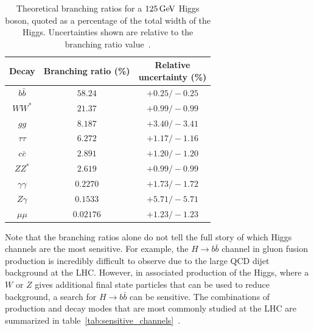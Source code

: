 \begin{table}[h!]
\centering
\captionsetup{justification=centering}

\hspace{-10pt}
\begin{tabular}{|c|c|c|}
\hline
Decay & Branching ratio (\%) & \specialcell{Relative\\uncertainty (\%)} \\ \hline
$b\bar{b}$ & $58.24$ & $+0.25/-0.25$\\ \hline
$WW^*$ & $21.37$ & $+0.99/-0.99$ \\ \hline
$gg$ & $8.187$ & $+3.40/-3.41$ \\ \hline
$\tau\tau$ & $6.272$ & $+1.17/-1.16$ \\ \hline
$c\bar{c}$ & $2.891$ & $+1.20/-1.20$ \\ \hline
$ZZ^*$ & $2.619$ & $+0.99/-0.99$ \\ \hline
$\gamma\gamma$ & $0.2270$ & $+1.73/-1.72$ \\ \hline
$Z\gamma$ & $0.1533$ & $+5.71/-5.71$ \\ \hline
$\mu\mu$ & $0.02176$ & $+1.23/-1.23$ \\ \hline
\end{tabular}

\caption{
Theoretical branching ratios for a $125 \GeV$ Higgs boson, quoted as a percentage of the total width of the Higgs. Uncertainties shown are relative to the branching ratio value~\cite{LHCXSWG}. 
}
\label{tab:Higgs_BR}
\end{table}

Note that the branching ratios alone do not tell the full story of which Higgs channels are the most sensitive. For example, the $H\to b\bar{b}$ channel in gluon fusion production is incredibly difficult to observe due to the large QCD dijet background at the LHC. However, in associated production of the Higgs, where a $W$ or $Z$ gives additional final state particles that can be used to reduce background, a search for $H\to b\bar{b}$ can be sensitive. The combinations of production and decay modes that are most commonly studied at the LHC are summarized in table~\ref{tab:sensitive_channels}~\cite{Tully}.

